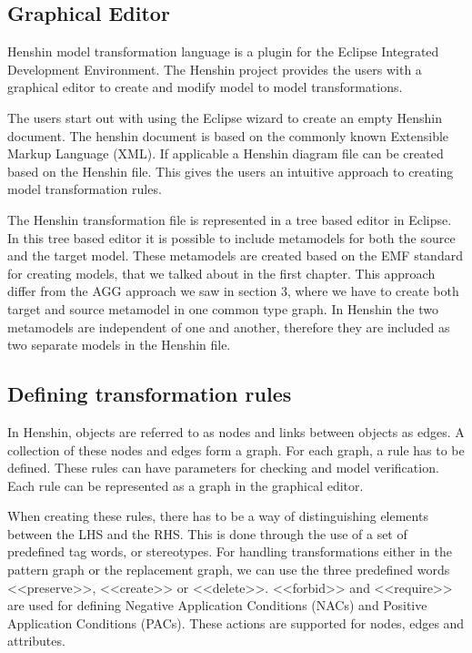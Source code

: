 \documentclass[pdftex,11pt,a4paper]{article}
\begin{document}
\subsection{Graphical Editor}
\noindent Henshin model transformation language is a plugin for the Eclipse
Integrated Development Environment\cite{Eclipse}. The Henshin project provides
the users with a graphical editor to create and modify model to model
transformations. 

The users start out with using the Eclipse wizard to create an empty Henshin
document. The henshin document is based on the commonly known Extensible Markup
Language (XML)\cite{XML}. If applicable a Henshin diagram file can be created
based on the Henshin file. This gives the users an intuitive approach to
creating model transformation rules.

The Henshin transformation file is represented in a tree based editor in
Eclipse. In this tree based editor it is possible to include metamodels for both
the source and the target model. These metamodels are created based on the EMF
standard for creating models, that we talked about in the first chapter.
This approach differ from the AGG approach we saw in section 3, where we have
to create both target and source metamodel in one common type graph. In Henshin
the two metamodels are independent of one and another, therefore they are
included as two separate models in the Henshin file. 

\subsection{Defining transformation rules}

\noindent In Henshin, objects are referred to as nodes and links between objects
as edges. A collection of these nodes and edges form a graph. For each graph, a
rule has to be defined. These rules can have parameters for checking and model
verification. Each rule can be represented as a graph in the graphical
editor. 

\indent When creating these rules, there has to be a way of
distinguishing elements between the LHS and the RHS. This is done through the
use of a set of predefined tag words, or stereotypes. For handling transformations
either in the pattern graph or the replacement graph, we can use the three
predefined words <<preserve>>, <<create>> or <<delete>>. <<forbid>> and
<<require>> are used for defining Negative Application Conditions (NACs) and
Positive Application Conditions (PACs). These actions are supported for nodes,
edges and attributes. 
\end{document}
